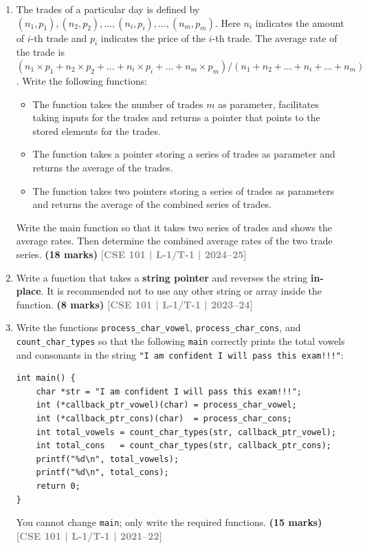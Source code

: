 \documentclass[12pt,a3paper]{article}
\newcommand{\yr}[1]{\hfill\textcolor{gray}{\small\textbf{[#1]}}}
\newcommand{\mk}[1]{\textcolor{orange!70!black}{\small\textbf{(#1 marks)}}}
\begin{document}
\begin{enumerate}

  \item[(c)] The trades of a particular day is defined by $(n_1, p_1), (n_2, p_2), \dots, (n_i, p_i), \dots, (n_m, p_m)$. Here $n_i$ indicates the amount of $i$-th trade and $p_i$ indicates the price of the $i$-th trade. The average rate of the trade is $(n_1 \times p_1 + n_2 \times p_2 + \dots + n_i \times p_i + \dots + n_m \times p_m) / (n_1 + n_2 + \dots + n_i + \dots + n_m)$. Write the following functions:
    
    \begin{itemize}
        \item[(i)] The function takes the number of trades $m$ as parameter, facilitates taking inputs for the trades and returns a pointer that points to the stored elements for the trades.
        \item[(ii)] The function takes a pointer storing a series of trades as parameter and returns the average of the trades.
        \item[(iii)] The function takes two pointers storing a series of trades as parameters and returns the average of the combined series of trades.
    \end{itemize}
    Write the main function so that it takes two series of trades and shows the average rates. Then determine the combined average rates of the two trade series.
\mk{18} \yr{CSE 101 | L-1/T-1 | 2024--25}


\item Write a function that takes a \textbf{string pointer} and reverses the string \textbf{in-place}. It is recommended not to use any other string or array inside the function.
\mk{8} \yr{CSE 101 | L-1/T-1 | 2023--24}

\item Write the functions \texttt{process\_char\_vowel}, \texttt{process\_char\_cons}, and \texttt{count\_char\_types} so that the following \texttt{main} correctly prints the total vowels and consonants in the string \texttt{"I am confident I will pass this exam!!!"}:
 
\begin{lstlisting}
int main() {
    char *str = "I am confident I will pass this exam!!!";
    int (*callback_ptr_vowel)(char) = process_char_vowel;
    int (*callback_ptr_cons)(char)  = process_char_cons;
    int total_vowels = count_char_types(str, callback_ptr_vowel);
    int total_cons   = count_char_types(str, callback_ptr_cons);
    printf("%d\n", total_vowels);
    printf("%d\n", total_cons);
    return 0;
}
\end{lstlisting}
You cannot change \texttt{main}; only write the required functions.
\mk{15} \yr{CSE 101 | L-1/T-1 | 2021--22}


\end{enumerate}
\end{document}
